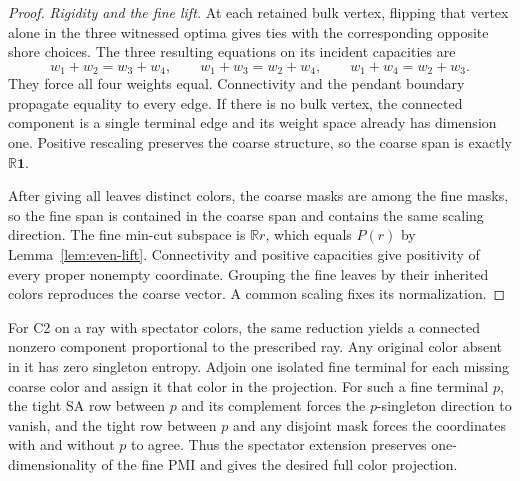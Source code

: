 \documentclass[11pt]{article}
\begin{document}
\begin{proof}
\emph{Rigidity and the fine lift.}
At each retained bulk vertex, flipping that vertex alone in the
three witnessed optima gives ties with the corresponding
opposite shore choices. The three resulting equations on its
incident capacities are
\[
 w_1+w_2=w_3+w_4,\qquad w_1+w_3=w_2+w_4,\qquad
 w_1+w_4=w_2+w_3.
\]
They force all four weights equal. Connectivity and the pendant
boundary propagate equality to every edge. If there is no bulk
vertex, the connected component is a single terminal edge and
its weight space already has dimension one. Positive rescaling
preserves the coarse structure, so the coarse span is exactly
\(\mathbb R\mathbf 1\).

After giving all leaves distinct colors, the coarse masks are
among the fine masks, so the fine span is contained in the coarse
span and contains the same scaling direction. The fine min-cut
subspace is \(\mathbb Rr\), which equals \(P(r)\) by
Lemma~\ref{lem:even-lift}. Connectivity and positive capacities
give positivity of every proper nonempty coordinate. Grouping
the fine leaves by their inherited colors reproduces the coarse
vector. A common scaling fixes its normalization.
\end{proof}

For C2 on a ray with spectator colors, the same reduction yields
a connected nonzero component proportional to the prescribed ray.
Any original color absent in it has zero singleton entropy.
Adjoin one isolated fine terminal for each missing coarse color
and assign it that color in the projection. For such a fine
terminal \(p\), the tight SA row between \(p\) and its complement
forces the \(p\)-singleton direction to vanish, and the tight
row between \(p\) and any disjoint mask forces the coordinates
with and without \(p\) to agree. Thus the spectator extension
preserves one-dimensionality of the fine PMI and gives the
desired full color projection.
\end{document}
